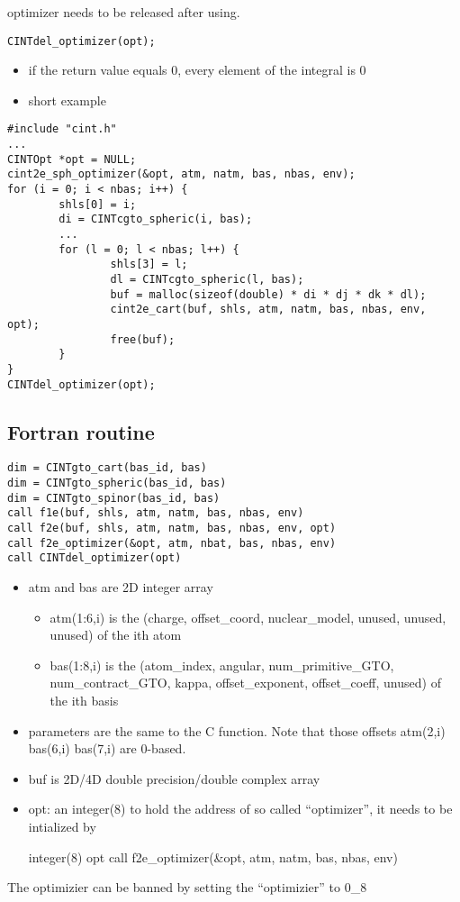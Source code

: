 \documentclass{article}
\begin{document}
optimizer needs to be released after using.

\begin{verbatim}
CINTdel_optimizer(opt);
\end{verbatim}
\begin{itemize}
\item
  if the return value equals 0, every element of the integral is 0

\item
  short example

\end{itemize}
\begin{verbatim}
#include "cint.h"
...
CINTOpt *opt = NULL;
cint2e_sph_optimizer(&opt, atm, natm, bas, nbas, env);
for (i = 0; i < nbas; i++) {
        shls[0] = i;
        di = CINTcgto_spheric(i, bas);
        ...
        for (l = 0; l < nbas; l++) {
                shls[3] = l;
                dl = CINTcgto_spheric(l, bas);
                buf = malloc(sizeof(double) * di * dj * dk * dl);
                cint2e_cart(buf, shls, atm, natm, bas, nbas, env, opt);
                free(buf);
        }
}
CINTdel_optimizer(opt);
\end{verbatim}
\subsection{Fortran routine}

\begin{verbatim}
dim = CINTgto_cart(bas_id, bas)
dim = CINTgto_spheric(bas_id, bas)
dim = CINTgto_spinor(bas_id, bas)
call f1e(buf, shls, atm, natm, bas, nbas, env)
call f2e(buf, shls, atm, natm, bas, nbas, env, opt)
call f2e_optimizer(&opt, atm, nbat, bas, nbas, env)
call CINTdel_optimizer(opt)
\end{verbatim}
\begin{itemize}
\item
  atm and bas are 2D integer array
  \begin{itemize}
  \item
    atm(1:6,i) is the (charge, offset\_coord, nuclear\_model, unused,
    unused, unused) of the ith atom
  \item
    bas(1:8,i) is the (atom\_index, angular, num\_primitive\_GTO,
    num\_contract\_GTO, kappa, offset\_exponent, offset\_coeff, unused)
    of the ith basis
  \end{itemize}
\item
  parameters are the same to the C function. Note that those offsets
  atm(2,i) bas(6,i) bas(7,i) are 0-based.
\item
  buf is 2D/4D double precision/double complex array
\item
  opt: an integer(8) to hold the address of so called ``optimizer'',
  it needs to be intialized by

  integer(8) opt call f2e\_optimizer(\&opt, atm, natm, bas, nbas,
  env)

\end{itemize}
The optimizier can be banned by setting the ``optimizier'' to 0\_8
\end{document}
